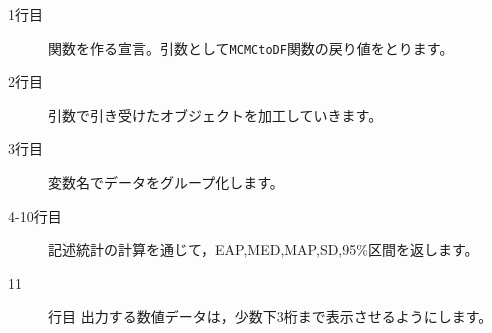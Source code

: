 \begin{description}
	\item[1行目] 関数を作る宣言。引数として\verb|MCMCtoDF|関数の戻り値をとります。
	\item[2行目] 引数で引き受けたオブジェクトを加工していきます。
	\item[3行目] 変数名でデータをグループ化します。
	\item[4-10行目] 記述統計の計算を通じて，EAP,MED,MAP,SD,95\%区間を返します。
	\item[11]行目 出力する数値データは，少数下3桁まで表示させるようにします。
\end{description}
